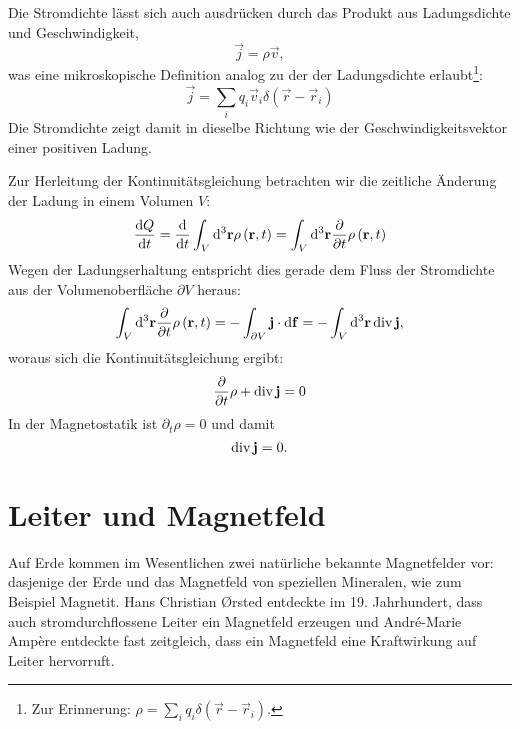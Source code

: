 Die Stromdichte lässt sich auch ausdrücken durch das Produkt aus Ladungsdichte und Geschwindigkeit,
\begin{equation*}
	\vec {j}=\rho \vec {v},
\end{equation*}
was eine mikroskopische Definition analog zu der der Ladungsdichte erlaubt\footnote{Zur Erinnerung: $\rho =\sum _{i}q_{i}\delta \left(\vec {r}-\vec {r}_{i}\right)$.}:
\begin{equation*}
	\vec {j}=\sum _{i}q_{i}\vec {v}_{i}\delta \left(\vec {r}-\vec {r}_{i}\right)
\end{equation*}
Die Stromdichte zeigt damit in dieselbe Richtung wie der Geschwindigkeitsvektor einer positiven Ladung.

Zur Herleitung der Kontinuitätsgleichung betrachten wir die zeitliche Änderung der Ladung in einem Volumen $V$:
\begin{equation*}
	\frac{\mathop{}\!\mathrm{d} Q}{\mathop{}\!\mathrm{d} t}=\frac{\mathop{}\!\mathrm{d} }{\mathop{}\!\mathrm{d} t}\int _{V}\mathop{}\!\mathrm{d}^{3}\mathbf{r}\rho \left(\mathbf{r},t\right)=\int _{V}\mathop{}\!\mathrm{d} ^{3}\mathbf{r}\frac{\partial }{\partial t}\rho \left(\mathbf{r},t\right)
\end{equation*}
Wegen der Ladungserhaltung entspricht dies gerade dem Fluss der Stromdichte aus der Volumenoberfläche $\partial V$ heraus:
\begin{equation*}
	\int _{V}\mathop{}\!\mathrm{d} ^{3}\mathbf{r}\frac{\partial }{\partial t}\rho \left(\mathbf{r},t\right)=-\int _{\partial V}\mathbf{j}\cdot \mathop{}\!\mathrm{d} \mathbf{f}=-\int _{V}\mathop{}\!\mathrm{d} ^{3}\mathbf{r}\operatorname{div} \mathbf{j},
\end{equation*}
woraus sich die Kontinuitätsgleichung ergibt:
\begin{equation*}
	\frac{\partial }{\partial t}\rho +\operatorname{div} \mathbf{j}=0
\end{equation*}
In der Magnetostatik ist $\partial _{t}\rho =0$ und damit
\begin{equation*}
	\operatorname{div} \mathbf{j}=0.
\end{equation*}
\section{Leiter und Magnetfeld}

Auf Erde kommen im Wesentlichen zwei natürliche bekannte Magnetfelder vor: dasjenige der Erde und das Magnetfeld von speziellen Mineralen, wie zum Beispiel Magnetit. Hans Christian \O{}rsted entdeckte im 19. Jahrhundert, dass auch stromdurchflossene Leiter ein Magnetfeld erzeugen und André-Marie Ampère entdeckte fast zeitgleich, dass ein Magnetfeld eine Kraftwirkung auf Leiter hervorruft.

